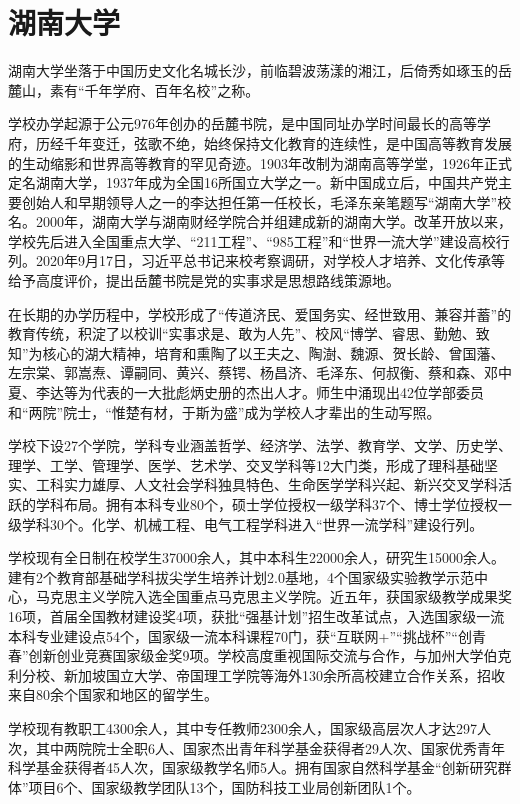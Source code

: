 \chapter{湖南大学}


湖南大学坐落于中国历史文化名城长沙，前临碧波荡漾的湘江，后倚秀如琢玉的岳麓山，素有“千年学府、百年名校”之称。

学校办学起源于公元976年创办的岳麓书院，是中国同址办学时间最长的高等学府，历经千年变迁，弦歌不绝，始终保持文化教育的连续性，是中国高等教育发展的生动缩影和世界高等教育的罕见奇迹。1903年改制为湖南高等学堂，1926年正式定名湖南大学，1937年成为全国16所国立大学之一。新中国成立后，中国共产党主要创始人和早期领导人之一的李达担任第一任校长，毛泽东亲笔题写“湖南大学”校名。2000年，湖南大学与湖南财经学院合并组建成新的湖南大学。改革开放以来，学校先后进入全国重点大学、“211工程”、“985工程”和“世界一流大学”建设高校行列。2020年9月17日，习近平总书记来校考察调研，对学校人才培养、文化传承等给予高度评价，提出岳麓书院是党的实事求是思想路线策源地。

在长期的办学历程中，学校形成了“传道济民、爱国务实、经世致用、兼容并蓄”的教育传统，积淀了以校训“实事求是、敢为人先”、校风“博学、睿思、勤勉、致知”为核心的湖大精神，培育和熏陶了以王夫之、陶澍、魏源、贺长龄、曾国藩、左宗棠、郭嵩焘、谭嗣同、黄兴、蔡锷、杨昌济、毛泽东、何叔衡、蔡和森、邓中夏、李达等为代表的一大批彪炳史册的杰出人才。师生中涌现出42位学部委员和“两院”院士，“惟楚有材，于斯为盛”成为学校人才辈出的生动写照。

学校下设27个学院，学科专业涵盖哲学、经济学、法学、教育学、文学、历史学、理学、工学、管理学、医学、艺术学、交叉学科等12大门类，形成了理科基础坚实、工科实力雄厚、人文社会学科独具特色、生命医学学科兴起、新兴交叉学科活跃的学科布局。拥有本科专业80个，硕士学位授权一级学科37个、博士学位授权一级学科30个。化学、机械工程、电气工程学科进入“世界一流学科”建设行列。

学校现有全日制在校学生37000余人，其中本科生22000余人，研究生15000余人。建有2个教育部基础学科拔尖学生培养计划2.0基地，4个国家级实验教学示范中心，马克思主义学院入选全国重点马克思主义学院。近五年，获国家级教学成果奖16项，首届全国教材建设奖4项，获批“强基计划”招生改革试点，入选国家级一流本科专业建设点54个，国家级一流本科课程70门，获“互联网+”“挑战杯”“创青春”创新创业竞赛国家级金奖9项。学校高度重视国际交流与合作，与加州大学伯克利分校、新加坡国立大学、帝国理工学院等海外130余所高校建立合作关系，招收来自80余个国家和地区的留学生。

学校现有教职工4300余人，其中专任教师2300余人，国家级高层次人才达297人次，其中两院院士全职6人、国家杰出青年科学基金获得者29人次、国家优秀青年科学基金获得者45人次，国家级教学名师5人。拥有国家自然科学基金“创新研究群体”项目6个、国家级教学团队13个，国防科技工业局创新团队1个。

